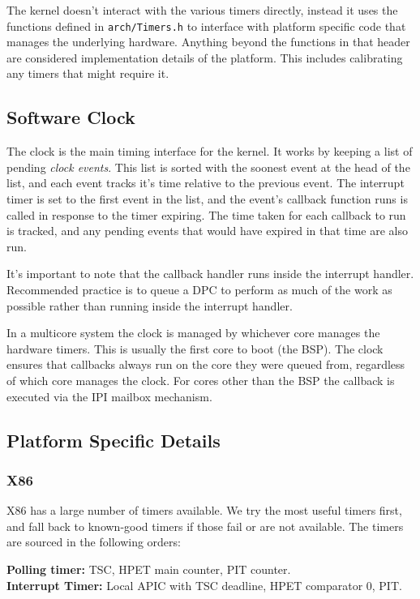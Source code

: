 The kernel doesn't interact with the various timers directly, instead it uses the functions defined in \verb|arch/Timers.h| to interface with platform specific code that manages the underlying hardware. Anything beyond the functions in that header are considered implementation details of the platform. This includes calibrating any timers that might require it.

\subsection{Software Clock}
The clock is the main timing interface for the kernel. It works by keeping a list of pending \textit{clock events}. This list is sorted with the soonest event at the head of the list, and each event tracks it's time relative to the previous event. The interrupt timer is set to the first event in the list, and the event's callback function runs is called in response to the timer expiring. The time taken for each callback to run is tracked, and any pending events that would have expired in that time are also run.

It's important to note that the callback handler runs inside the interrupt handler. Recommended practice is to queue a DPC to perform as much of the work as possible rather than running inside the interrupt handler.

In a multicore system the clock is managed by whichever core manages the hardware timers. This is usually the first core to boot (the BSP). The clock ensures that callbacks always run on the core they were queued from, regardless of which core manages the clock. For cores other than the BSP the callback is executed via the IPI mailbox mechanism.

\subsection{Platform Specific Details}

\subsubsection{X86}
X86 has a large number of timers available. We try the most useful timers first, and fall back to known-good timers if those fail or are not available. The timers are sourced in the following orders:

\textbf{Polling timer:} TSC, HPET main counter, PIT counter.\\
\textbf{Interrupt Timer:} Local APIC with TSC deadline, HPET comparator 0, PIT.

